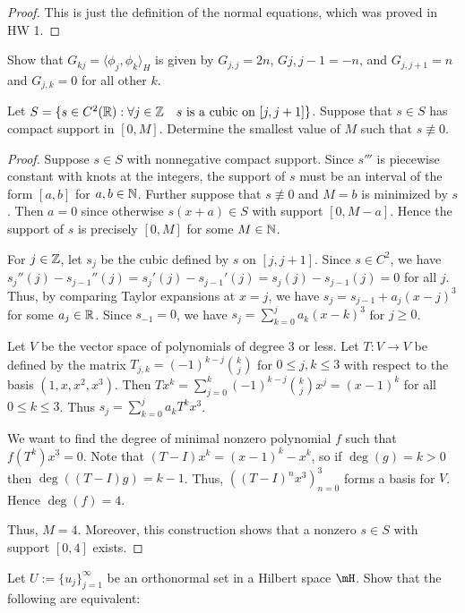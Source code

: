 \documentclass{article}
\begin{document}
\begin{proof}
This is just the definition of the normal equations, which was proved in HW 1.
\end{proof}

 Show that $G_{kj} = \langle \phi_j, \phi_k \rangle_H$ is given by
$G_{j,j} = 2n$, $G{j,j-1} = -n$, and $G_{j, j+1} = n$ and $G_{j,k} = 0$ for all other $k$.



 Let $S = \{ s \in C^2(\mathbb{R}) : \forall j \in \mathbb{Z} \quad s \text{ is a cubic on } [j, j+1] \}$.  Suppose that $s \in S$ has compact support in $[0,M]$. Determine the smallest value of $M$ such that $s \not \equiv 0$.

\begin{proof}
Suppose $s \in S$ with nonnegative compact support. Since $s'''$ is piecewise constant with knots at the integers, the support of $s$ must be an interval of the form $[a,b]$ for $a,b \in \mathbb{N}$. Further suppose that $s \not \equiv 0$ and $M = b$ is minimized by $s$. Then $a = 0$ since otherwise $s(x+a) \in S$ with support $[0, M-a]$.  Hence the support of $s$ is precisely $[0,M]$ for some $M \in \mathbb{N}$.

For $j \in \mathbb{Z}$, let $s_j$ be the cubic defined by $s$ on $[j, j+1]$. Since $s \in C^2$, we have $s_{j}''(j) - s_{j-1}''(j) = s_{j}'(j) - s_{j-1}'(j) = s_{j}(j) - s_{j-1}(j) = 0$ for all $j$.  Thus, by comparing Taylor expansions at $x = j$, we have $s_{j} = s_{j-1} + a_j (x-j)^3$ for some $a_{j} \in \mathbb{R}$. Since $s_{-1} = 0$, we have $s_j = \sum_{k=0}^{j} a_k (x - k)^3$ for $j \ge 0$.

Let $V$ be the vector space of polynomials of degree $3$ or less. Let $T: V \to V$ be defined by the matrix $T_{j,k} = (-1)^{k-j} {k \choose j}$ for $0 \le j,k \le 3$ with respect to the basis $(1, x, x^2, x^3)$. Then $T x^k = \sum_{j=0}^k (-1)^{k-j} {k \choose j} x^j = (x-1)^k$ for all $0 \le k \le 3$. Thus $s_j = \sum_{k=0}^{j} a_k T^k x^3$.

 We want to find the degree of minimal nonzero polynomial $f$ such that $f(T^k)x^3  = 0$. Note that $(T - I) x^k = (x - 1)^k - x^k$, so if $\deg(g) = k > 0$ then $\deg((T-I)g) = k - 1$.  Thus, $((T-I)^n x^3)_{n=0}^3$ forms a basis for $V$. Hence $\deg(f) = 4$.

Thus, $M = 4$. Moreover, this construction shows that a nonzero $s \in S$ with support $[0,4]$ exists.
\end{proof}

 Let $U := \{u_j\}_{j=1}^\infty$ be an orthonormal set in a Hilbert space $\mH$. Show that the following are equivalent:
\end{document}
